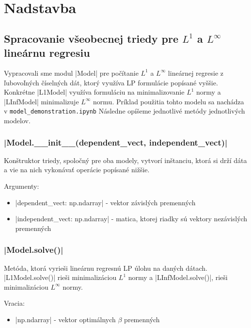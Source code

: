 \documentclass[report.tex]{subfiles}
\begin{document}
\section{Nadstavba}\label{sec:E}

\subsection{Spracovanie všeobecnej triedy pre $L^1$ a $L^{\infty}$ lineárnu regresiu}

Vypracovali sme modul \pyth|Model| pre počítanie $L^1$ a $L^{\infty}$ lineárnej regresie z ľubovoľných číselných dát, ktorý využíva LP formulácie popísané vyššie. Konkrétne \pyth|L1Model| využíva formuláciu na minimalizovanie $L^1$ normy a \pyth|LInfModel| minimalizuje $L^{\infty}$ normu. Príklad použitia tohto modelu sa nachádza v \verb|model_demonstration.ipynb| Následne opíšeme jednotlivé metódy jednotlivých modelov.

\subsubsection*{\pyth|Model.__init__(dependent_vect, independent_vect)|}

Konštruktor triedy, spoločný pre oba modely, vytvorí inštanciu, ktorá si drží dáta a vie na nich vykonávať operácie popísané nižšie. 

Argumenty:

\begin{itemize}
	\item \pyth|dependent_vect: np.ndarray| - vektor závislých premenných
	\item \pyth|independent_vect: np.ndarray| - matica, ktorej riadky sú vektory nezávislých premenných
\end{itemize}

\subsubsection*{\pyth|Model.solve()|}

Metóda, ktorá vyrieši lineárnu regresnú LP úlohu na daných dátach. \pyth|L1Model.solve()| rieši minimalizáciou $L^1$ normy a \pyth|LInfModel.solve()|, rieši minimalizáciou $L^{\infty}$ normy. 

Vracia:

\begin{itemize}
	\item \pyth|np.ndarray| - vektor optimálnych $\beta$ premenných
\end{itemize}
\end{document}
